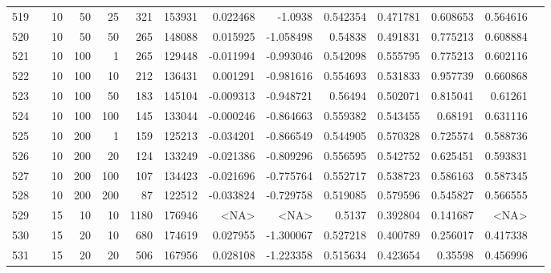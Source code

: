 \begin{longtable}{llrrrrrrrrrrrr}
		519 & &           10 &                50 &           25 &         321 &     153931 &  0.022468 &   -1.0938 &  0.542354 &    0.471781 &       0.608653 &  0.564616 \\
		520 & &           10 &                50 &           50 &         265 &     148088 &  0.015925 & -1.058498 &   0.54838 &    0.491831 &       0.775213 &  0.608884 \\
		521 & &           10 &               100 &            1 &         265 &     129448 & -0.011994 & -0.993046 &  0.542098 &    0.555795 &       0.775213 &  0.602116 \\
		522 & &           10 &               100 &           10 &         212 &     136431 &  0.001291 & -0.981616 &  0.554693 &    0.531833 &       0.957739 &  0.660868 \\
		523 & &           10 &               100 &           50 &         183 &     145104 & -0.009313 & -0.948721 &   0.56494 &    0.502071 &       0.815041 &   0.61261 \\
		524 & &           10 &               100 &          100 &         145 &     133044 & -0.000246 & -0.864663 &  0.559382 &    0.543455 &        0.68191 &  0.631116 \\
		525 & &           10 &               200 &            1 &         159 &     125213 & -0.034201 & -0.866549 &  0.544905 &    0.570328 &       0.725574 &  0.588736 \\
		526 & &           10 &               200 &           20 &         124 &     133249 & -0.021386 & -0.809296 &  0.556595 &    0.542752 &       0.625451 &  0.593831 \\
		527 & &           10 &               200 &          100 &         107 &     134423 & -0.021696 & -0.775764 &  0.552717 &    0.538723 &       0.586163 &  0.587345 \\
		528 & &           10 &               200 &          200 &          87 &     122512 & -0.033824 & -0.729758 &  0.519085 &    0.579596 &       0.545827 &  0.566555 \\
		529 & &           15 &                10 &           10 &           1180 &     176946 &      <NA> &      <NA> &    0.5137 &    0.392804 &       0.141687 &  <NA> \\
		530 & &           15 &                20 &           10 &         680 &     174619 &  0.027955 & -1.300067 &  0.527218 &    0.400789 &       0.256017 &  0.417338 \\
		531 & &           15 &                20 &           20 &         506 &     167956 &  0.028108 & -1.223358 &  0.515634 &    0.423654 &        0.35598 &  0.456996 \\

\end{longtable}
